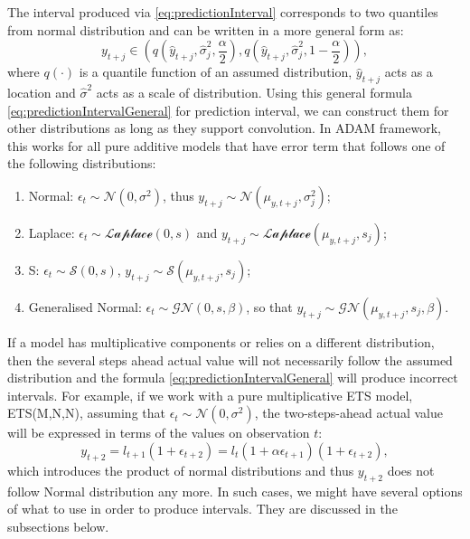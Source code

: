 \documentclass[
]{book}
\providecommand{\tightlist}{%
  \setlength{\itemsep}{0pt}\setlength{\parskip}{0pt}}
\theoremstyle{definition}
\theoremstyle{definition}
\theoremstyle{definition}
\theoremstyle{definition}
\theoremstyle{remark}
\begin{document}
The interval produced via \eqref{eq:predictionInterval} corresponds to two quantiles from normal distribution and can be written in a more general form as:
\begin{equation}
    y_{t+j} \in \left(q \left(\hat{y}_{t+j},\hat{\sigma}_j^2,\frac{\alpha}{2}\right), q\left(\hat{y}_{t+j},\hat{\sigma}_j^2,1-\frac{\alpha}{2}\right)\right),
    \label{eq:predictionIntervalGeneral}
\end{equation}
where \(q(\cdot)\) is a quantile function of an assumed distribution, \(\hat{y}_{t+j}\) acts as a location and \(\hat{\sigma}^2\) acts as a scale of distribution. Using this general formula \eqref{eq:predictionIntervalGeneral} for prediction interval, we can construct them for other distributions as long as they support convolution. In ADAM framework, this works for all pure additive models that have error term that follows one of the following distributions:

\begin{enumerate}
\def\labelenumi{\arabic{enumi}.}
\tightlist
\item
  Normal: \(\epsilon_t \sim \mathcal{N}(0, \sigma^2)\), thus \(y_{t+j} \sim \mathcal{N}(\mu_{y, t+j}, \sigma_j^2)\);
\item
  Laplace: \(\epsilon_t \sim \mathcal{Laplace}(0, s)\) and \(y_{t+j} \sim \mathcal{Laplace}(\mu_{y, t+j}, s_j)\);
\item
  S: \(\epsilon_t \sim \mathcal{S}(0, s)\), \(y_{t+j} \sim \mathcal{S}(\mu_{y, t+j}, s_j)\);
\item
  Generalised Normal: \(\epsilon_t \sim \mathcal{GN}(0, s, \beta)\), so that \(y_{t+j} \sim \mathcal{GN}(\mu_{y, t+j}, s_j, \beta)\).
\end{enumerate}

If a model has multiplicative components or relies on a different distribution, then the several steps ahead actual value will not necessarily follow the assumed distribution and the formula \eqref{eq:predictionIntervalGeneral} will produce incorrect intervals. For example, if we work with a pure multiplicative ETS model, ETS(M,N,N), assuming that \(\epsilon_t \sim \mathcal{N}(0, \sigma^2)\), the two-steps-ahead actual value will be expressed in terms of the values on observation \(t\):
\begin{equation}
    y_{t+2} = l_{t+1} (1+\epsilon_{t+2}) = l_{t} (1+\alpha \epsilon_{t+1}) (1+\epsilon_{t+2}) ,
    \label{eq:ETSMNN2Steps}
\end{equation}
which introduces the product of normal distributions and thus \(y_{t+2}\) does not follow Normal distribution any more. In such cases, we might have several options of what to use in order to produce intervals. They are discussed in the subsections below.
\end{document}
